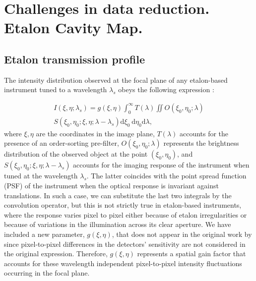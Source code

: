 \chapter{\label{CH:challenges}Challenges in data reduction. Etalon Cavity Map.}

\section{\label{eta_corr_susec: etalon_transmission}Etalon transmission profile}

The intensity distribution observed at the focal plane of any etalon-based instrument tuned to a wavelength $\lambda_s$ obeys the following expression \citep{franI}:

\begin{multline}
    I\left(\xi, \eta ; \lambda_{s}\right)=g(\xi, \eta)\int_{0}^{\infty} T(\lambda) \iint  O\left(\xi_0, \eta_0 ; \lambda\right) \\ S\left(\xi_0, \eta_0; \xi , \eta; \lambda-\lambda_{s}\right)  \mathrm{d} \xi_{0} \mathrm{~d} \eta_{0}\mathrm{d} \lambda ,
    \label{eq_eta_corr: General}
\end{multline}
where $\xi, \eta$ are the coordinates in the image plane, $T(\lambda)$ accounts for the presence of an order-sorting pre-filter, $O\left(\xi_0, \eta_0 ; \lambda\right)$ represents the brightness distribution of the observed object at the point $\left(\xi_0, \eta_0\right)$, and $S\left(\xi_0, \eta_0; \xi , \eta; \lambda-\lambda_{s}\right)$ accounts for the imaging response of the instrument when tuned at the wavelength $\lambda_{s}$. The latter coincides with the point spread function (PSF) of the instrument when the optical response is invariant against translations. In such a case, we can substitute the last two integrals by the convolution operator, but this is not strictly true in etalon-based instruments, where the response varies pixel to pixel either because of etalon irregularities or because of variations in the illumination across its clear aperture. We have included a new parameter, $g(\xi, \eta)$, that does not appear in the original work by \cite{franI} since pixel-to-pixel differences in the detectors' sensitivity are not considered in the original expression. Therefore, $g(\xi, \eta)$ represents a spatial gain factor that accounts for these wavelength independent pixel-to-pixel intensity fluctuations occurring in the focal plane.

